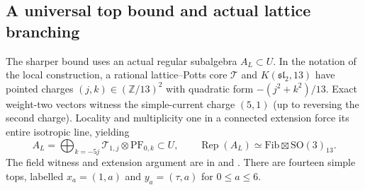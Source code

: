 \subsection{A universal top bound and actual lattice branching}

The sharper bound uses an actual regular subalgebra $A_L\subset U$.
In the notation of the local construction, a rational lattice--Potts
core $\mathcal T$ and $K(\mathfrak{sl}_2,13)$ have pointed charges
$(j,k)\in(\mathbb Z/13)^2$ with quadratic form
$-(j^2+k^2)/13$. Exact weight-two vectors witness the simple-current
charge $(5,1)$ (up to reversing the second charge). Locality and
multiplicity one in a connected extension force its entire isotropic
line, yielding
\[
 A_L=\bigoplus_{k=-5j}\mathcal T_{1,j}\otimes\mathrm{PF}_{0,k}
 \subset U,\qquad
 \operatorname{Rep}(A_L)\simeq
 \mathrm{Fib}\boxtimes\mathrm{SO}(3)_{13}.
\]
The field witness and extension argument are in
 and
.
There are fourteen simple tops, labelled $x_a=(1,a)$ and
$y_a=(\tau,a)$ for $0\le a\le6$.

